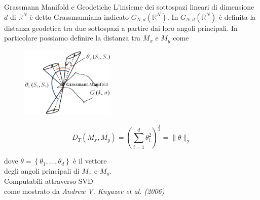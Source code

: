 \documentclass[usenames,dvipsnames,9pt]{beamer}
\newcommand{\RR}{\mathbb{R}}
\theoremstyle{definition}
\begin{document}
\begin{frame}{Grassmann Manifold e Geodetiche}
L'insieme dei sottospazi lineari di dimensione $d$ di $\RR^{N}$ è detto Grassmanniana indicato $G_{N,d}(\RR^{N})$. In $G_{N,d}(\RR^{N})$ è definita la distanza geodetica tra due sottospazi a partire dai loro angoli principali. In particolare possiamo definire la distanza tra $M_x$ e $M_y$ come

\begin{figure}
    \centering
    \includegraphics[width=0.4\textwidth]{graphics/principalangles.eps}
\end{figure}

\begin{equation*}
	D_{T}\left(M_{x}, M_{y}\right)=\left(\sum_{i=1}^{d} \theta_{i}^{2}\right)^{\frac{1}{2}}=\|\theta\|_{2}
\end{equation*}

dove $\theta=\left\{\theta_{1}, \ldots, \theta_{d}\right\}$ è il vettore \\ degli angoli principali di $M_x$ e $M_y$. \\
Computabili attraverso SVD \\
come mostrato da
\textit{Andrew V. Knyazev et al. (2006)}
\end{frame}
\end{document}
